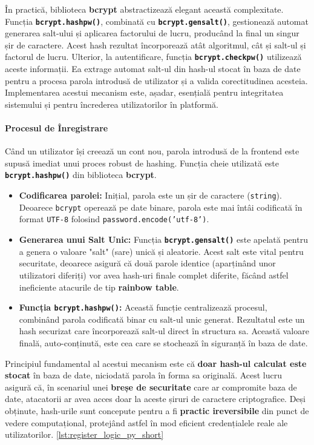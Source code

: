 \documentclass[12pt, a4paper, oneside, romanian]{teza-upb}
\begin{document}
În practică, biblioteca \textbf{bcrypt} abstractizează elegant această complexitate. Funcția \textbf{\texttt{bcrypt.hashpw()}}, combinată cu \textbf{\texttt{bcrypt.gensalt()}}, gestionează automat generarea salt-ului și aplicarea factorului de lucru, producând la final un singur șir de caractere. Acest hash rezultat încorporează atât algoritmul, cât și salt-ul și factorul de lucru. Ulterior, la autentificare, funcția \textbf{\texttt{bcrypt.checkpw()}} utilizează aceste informații. Ea extrage automat salt-ul din hash-ul stocat în baza de date pentru a procesa parola introdusă de utilizator și a valida corectitudinea acesteia. Implementarea acestui mecanism este, așadar, esențială pentru integritatea sistemului și pentru încrederea utilizatorilor în platformă.


\paragraph{Procesul de Înregistrare}
Când un utilizator își creează un cont nou, parola introdusă de la frontend este supusă imediat unui proces robust de hashing. Funcția cheie utilizată este \textbf{\texttt{bcrypt.hashpw()}} din biblioteca \textbf{bcrypt}.

\begin{itemize}
	\item \textbf{Codificarea parolei:} Inițial, parola este un șir de caractere (\texttt{string}). Deoarece \texttt{bcrypt} operează pe date binare, parola este mai întâi codificată în format \texttt{UTF-8} folosind \texttt{password.encode('utf-8')}.
	
	\item \textbf{Generarea unui Salt Unic:} Funcția \textbf{\texttt{bcrypt.gensalt()}} este apelată pentru a genera o valoare "salt" (sare) unică și aleatorie. Acest salt este vital pentru securitate, deoarece asigură că două parole identice (aparținând unor utilizatori diferiți) vor avea hash-uri finale complet diferite, făcând astfel ineficiente atacurile de tip \textbf{rainbow table}.
	
	\item \textbf{Funcția \texttt{bcrypt.hashpw()}:} Această funcție centralizează procesul, combinând parola codificată binar cu salt-ul unic generat. Rezultatul este un hash securizat care încorporează salt-ul direct în structura sa. Această valoare finală, auto-conținută, este cea care se stochează în siguranță în baza de date.
\end{itemize}

Principiul fundamental al acestui mecanism este că \textbf{doar hash-ul calculat este stocat} în baza de date, niciodată parola în forma sa originală. Acest lucru asigură că, în scenariul unei \textbf{breșe de securitate} care ar compromite baza de date, atacatorii ar avea acces doar la aceste șiruri de caractere criptografice. Deși obținute, hash-urile sunt concepute pentru a fi \textbf{practic ireversibile} din punct de vedere computațional, protejând astfel în mod eficient credențialele reale ale utilizatorilor. \ref {lst:register_logic_py_short}
\end{document}
